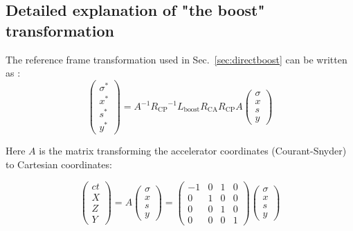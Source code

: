 \begin{appendices}
\renewcommand{\thesubsection}{A\arabic{subsection}}



\subsection{Detailed explanation of "the boost" transformation}
\label{app:boost}
The reference frame transformation used in Sec.~\ref{sec:directboost} can be written as \cite{hirata2, refpaper}:
\begin{equation}
\left( \begin{matrix}
\sigma^*\\
x^*\\
s^*\\
y^*
\end{matrix} \right) = A^{-1}{R_{\mathrm{CP}}}^{-1}L_{\mathrm{boost}}R_{\mathrm{CA}}R_{\mathrm{CP}}A
\left( \begin{matrix}
\sigma\\
x\\
s\\
y
\end{matrix} \right) 
\end{equation}

Here $A$ is the matrix transforming the accelerator coordinates (Courant-Snyder) to Cartesian coordinates:

\begin{equation}
\left( \begin{matrix}
ct\\
X\\
Z\\
Y
\end{matrix} \right) = A
\left( \begin{matrix}
\sigma\\
x\\
s\\
y
\end{matrix} \right) =
\left( \begin{matrix}
-1 &0 &1&0\\
0 &1 &0&0\\
0 &0 &1&0\\
0 &0 &0&1
\end{matrix} \right) 
\left( \begin{matrix}
\sigma\\
x\\
s\\
y
\end{matrix} \right)
\end{equation}


\end{appendices}
